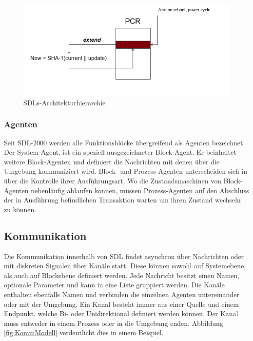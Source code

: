 \begin{figure}[ht]
	\centering
	\includegraphics[width=1\textwidth]{test.png}
	\caption{SDLs-Architekturhierarchie}
	\label{fig:ArchModell}
\end{figure}

\subsubsection{Agenten}
Seit \ac{SDL}-2000 werden alle Funktionsblöcke übergreifend als Agenten bezeichnet. Der System-Agent, ist ein speziell ausgezeichneter Block-Agent. Er beinhaltet weitere Block-Agenten und definiert die Nachrichten mit denen über die Umgebung kommuniziert wird. Block- und Prozess-Agenten unterscheiden sich in über die Kontrolle ihrer Ausführungsart. Wo die Zustandsmaschinen von Block-Agenten nebenläufig ablaufen können, müssen Prozess-Agenten auf den Abschluss der in Ausführung befindlichen Transaktion warten um ihren Zustand wechseln zu können.


\subsection{Kommunikation}
\label{ssc:Kommunikation}
Die Kommunikation innerhalb von \ac{SDL} findet asynchron über Nachrichten oder mit diskreten Signalen über Kanäle statt. 
Diese können sowohl auf Systemebene, als auch auf Blockebene definiert werden.
Jede Nachricht besitzt einen Namen, optionale Parameter und kann in eine Liste gruppiert werden. 
Die Kanäle enthalten ebenfalls Namen und verbinden die einzelnen Agenten untereinander oder mit der Umgebung.
Ein Kanal besteht immer aus einer Quelle und einem Endpunkt, welche Bi- oder Unidirektional definiert werden können. Der Kanal muss entweder in einem Prozess oder in die Umgebung enden.
Abbildung \ref{fig:KommModell} verdeutlicht dies in einem Beispiel.
 
